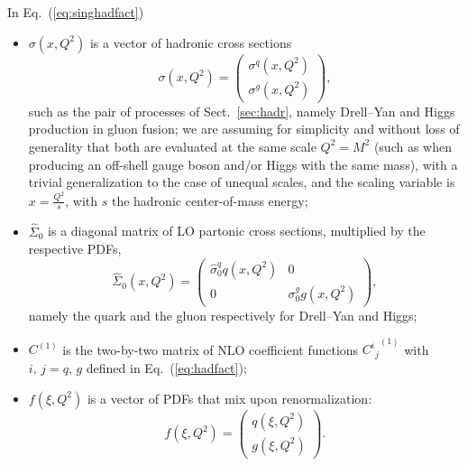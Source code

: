 In Eq.~(\ref{eq:singhadfact}) \begin{itemize}
  \item $\sigma(x,Q^2)$ is a vector of hadronic cross sections
\begin{equation}\label{eq:hadxsec}
   \sigma(x,Q^2)=\left(\begin{array}{c} \sigma^{q}(x,Q^2)\\ \sigma^{g} (x,Q^2)\end{array}\right),
\end{equation}
 such as
the pair of processes of Sect.~\ref{sec:hadr}, namely Drell--Yan  and
Higgs production in gluon fusion; we are assuming for simplicity  and without loss of
generality that both are evaluated at the same scale $Q^2=M^2$ (such
as when producing an off-shell gauge boson and/or Higgs with the same
mass), with a trivial generalization to the case of unequal scales,
and the scaling variable is $x=\frac{Q^2}{s}$, with $s$ the hadronic
center-of-mass energy;
\item $\hat \Sigma_0$ is a diagonal matrix of LO partonic cross sections,
  multiplied by the respective PDFs, 
\begin{equation}\label{eq:lohadxsec}
   \hat \Sigma_0(x,Q^2)=\left(\begin{array}{cc} \hat \sigma_0^{q} q (x,Q^2) &
   0 \\0 & \sigma_0^{g} g (x,Q^2) \end{array}\right),
\end{equation}
namely the quark and the gluon respectively for Drell--Yan and Higgs;
\item $C^{(1)}$ is the two-by-two matrix of NLO 
  coefficient functions ${C^i{}_{j}}^{(1)}$ with $i,\, j=q,\, g$
  defined in Eq.~(\ref{eq:hadfact});
\item $f(\xi,Q^2)$ is a vector of PDFs that mix upon renormalization:
\begin{equation}\label{eq:singpdf}
   f(\xi,Q^2)=\left(\begin{array}{c} q(\xi,Q^2) \\ g(\xi,Q^2) \end{array}\right).
\end{equation}
\end{itemize}

